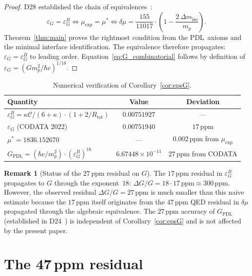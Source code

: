 \documentclass[11pt,a4paper]{article}
\theoremstyle{definition}
\newtheorem{remark}[theorem]{Remark}
\newcommand{\PDL}{\textnormal{PDL}}
\newcommand{\Rtot}{R_{\mathrm{tot}}}
\newcommand{\epsg}{\varepsilon_G}
\newcommand{\epsgB}{\varepsilon_G^B}
\newcommand{\muexp}{\mu_{\mathrm{exp}}}
\newcommand{\mustar}{\mu^*}
\newcommand{\dmu}{\delta\mu}
\newcommand{\dmiso}{\Delta m_{\mathrm{iso}}}
\newcommand{\kap}{\kappa}
\newcommand{\calC}{\mathcal{C}}
\newcommand{\GPDL}{G_{\mathrm{PDL}}}
\begin{document}
\begin{proof}
D28 established the chain of equivalences~\cite{PDL_D28_2026}:
\begin{equation}
\epsg = \epsgB \iff \muexp = \mustar \iff \dmu = \frac{155}{11017}\cdot\left(1-\frac{2\,\dmiso}{m_p}\right).
\end{equation}
Theorem~\ref{thm:main} proves the rightmost condition from the \PDL\ axioms and the minimal interface identification. The equivalence therefore propagates: $\epsg = \epsgB$ to leading order. Equation~\eqref{eq:G_combinatorial} follows by definition of $\epsg = (Gm_p^2/\hbar c)^{1/18}$.
\end{proof}

\begin{table}[ht]
\centering
\caption{Numerical verification of Corollary~\ref{cor:epsG}.}
\label{tab:epsG}
\bigskip
\begin{tabular}{lcc}
\toprule
Quantity & Value & Deviation \\
\midrule
$\epsgB = \kap\calC/(6+\kap)\cdot(1+2/\Rtot)$ & $0.00751927$ & --- \\
$\epsg$ (CODATA 2022) & $0.00751940$ & $17\,\mathrm{ppm}$ \\
$\mustar = 1836.152670$ & --- & $0.002\,\mathrm{ppm}$ from $\muexp$ \\
$G_{\mathrm{PDL}} = (\hbar c/m_p^2)\cdot(\epsgB)^{18}$ & $6.67448\times10^{-11}$ & $27\,\mathrm{ppm}$ from CODATA \\
\bottomrule
\end{tabular}
\end{table}

\begin{remark}[Status of the 27\,ppm residual on $G$]
The $17\,\mathrm{ppm}$ residual in $\epsgB$ propagates to $G$ through the exponent~$18$: $\Delta G/G = 18\cdot 17\,\mathrm{ppm} \approx 300\,\mathrm{ppm}$. However, the observed residual $\Delta G/G = 27\,\mathrm{ppm}$ is much smaller than this naive estimate because the $17\,\mathrm{ppm}$ itself originates from the $47\,\mathrm{ppm}$ QED residual in $\dmu$ propagated through the algebraic equivalence. The $27\,\mathrm{ppm}$ accuracy of $\GPDL$ (established in D24~\cite{Bridge_PDL_2026}) is independent of Corollary~\ref{cor:epsG} and is not affected by the present paper.
\end{remark}

\section{The 47\texorpdfstring{\,}{ }ppm residual}
\label{sec:residual}
\end{document}
